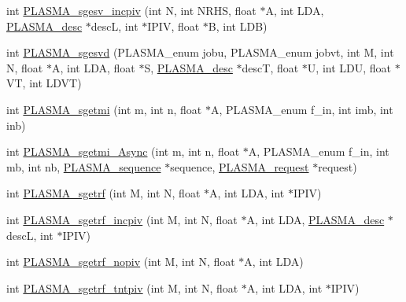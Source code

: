 \begin{DoxyCompactItemize}
\item 
int \hyperlink{group__float_gab9dab6c3f22b6cf8dad0fa2f1b563988_gab9dab6c3f22b6cf8dad0fa2f1b563988}{P\+L\+A\+S\+M\+A\+\_\+sgesv\+\_\+incpiv} (int N, int N\+R\+H\+S, float $\ast$A, int L\+D\+A, \hyperlink{structplasma__desc__t}{P\+L\+A\+S\+M\+A\+\_\+desc} $\ast$desc\+L, int $\ast$I\+P\+I\+V, float $\ast$B, int L\+D\+B)
\item 
int \hyperlink{group__float_gabaf1acf98c5bbd242f4e603c2bbfffb1_gabaf1acf98c5bbd242f4e603c2bbfffb1}{P\+L\+A\+S\+M\+A\+\_\+sgesvd} (P\+L\+A\+S\+M\+A\+\_\+enum jobu, P\+L\+A\+S\+M\+A\+\_\+enum jobvt, int M, int N, float $\ast$A, int L\+D\+A, float $\ast$S, \hyperlink{structplasma__desc__t}{P\+L\+A\+S\+M\+A\+\_\+desc} $\ast$desc\+T, float $\ast$U, int L\+D\+U, float $\ast$V\+T, int L\+D\+V\+T)
\item 
int \hyperlink{group__float_ga51861b9bdc9c8058822c32807a78fca7_ga51861b9bdc9c8058822c32807a78fca7}{P\+L\+A\+S\+M\+A\+\_\+sgetmi} (int m, int n, float $\ast$A, P\+L\+A\+S\+M\+A\+\_\+enum f\+\_\+in, int imb, int inb)
\item 
int \hyperlink{group__float_gaa35042844f1c885bc26a5f47293e3d45_gaa35042844f1c885bc26a5f47293e3d45}{P\+L\+A\+S\+M\+A\+\_\+sgetmi\+\_\+\+Async} (int m, int n, float $\ast$A, P\+L\+A\+S\+M\+A\+\_\+enum f\+\_\+in, int mb, int nb, \hyperlink{structplasma__sequence__t}{P\+L\+A\+S\+M\+A\+\_\+sequence} $\ast$sequence, \hyperlink{structplasma__request__t}{P\+L\+A\+S\+M\+A\+\_\+request} $\ast$request)
\item 
int \hyperlink{group__float_ga8bf6af99c20539f64fa60b64d99fc1be_ga8bf6af99c20539f64fa60b64d99fc1be}{P\+L\+A\+S\+M\+A\+\_\+sgetrf} (int M, int N, float $\ast$A, int L\+D\+A, int $\ast$I\+P\+I\+V)
\item 
int \hyperlink{group__float_ga2980cac88a14ba51d0ef99036f5ace69_ga2980cac88a14ba51d0ef99036f5ace69}{P\+L\+A\+S\+M\+A\+\_\+sgetrf\+\_\+incpiv} (int M, int N, float $\ast$A, int L\+D\+A, \hyperlink{structplasma__desc__t}{P\+L\+A\+S\+M\+A\+\_\+desc} $\ast$desc\+L, int $\ast$I\+P\+I\+V)
\item 
int \hyperlink{group__float_ga1c9ced92c5818ef3a6af88e6545ba1e6_ga1c9ced92c5818ef3a6af88e6545ba1e6}{P\+L\+A\+S\+M\+A\+\_\+sgetrf\+\_\+nopiv} (int M, int N, float $\ast$A, int L\+D\+A)
\item 
int \hyperlink{group__float_ga4a519bbf13b7a335ca2dd079693f9edc_ga4a519bbf13b7a335ca2dd079693f9edc}{P\+L\+A\+S\+M\+A\+\_\+sgetrf\+\_\+tntpiv} (int M, int N, float $\ast$A, int L\+D\+A, int $\ast$I\+P\+I\+V)
\item 

\end{DoxyCompactItemize}

